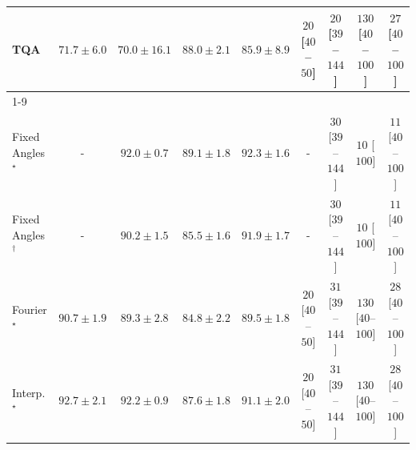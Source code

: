 \begin{tabular}{l|cccc|cccc|}
TQA & {\cellcolor[HTML]{FEA937}} \color[HTML]{000000} $71.7\pm 6.0$ & {\cellcolor[HTML]{FEB541}} \color[HTML]{000000} $70.0\pm 16.1$ & {\cellcolor[HTML]{B13F03}} \color[HTML]{F1F1F1} $88.0\pm 2.1$ & {\cellcolor[HTML]{C44802}} \color[HTML]{F1F1F1} $85.9\pm 8.9$ & {\cellcolor[HTML]{FFF4F0}} \color[HTML]{000000} $20$ [$40$--$50$] & {\cellcolor[HTML]{FFF4F0}} \color[HTML]{000000} $20$ [$39$--$144$] & {\cellcolor[HTML]{FDD9D6}} \color[HTML]{000000} $130$ [$40$--$100$] & {\cellcolor[HTML]{FFF3EF}} \color[HTML]{000000} $27$ [$40$--$100$] \\
\cline{1-9}
\multicolumn{9}{c}{\rule{0pt}{8pt}PP} \\
\midrule
Fixed Angles$^\star$ & {\cellcolor[HTML]{000000}} \color[HTML]{F1F1F1} {\cellcolor{white}} \color{black} - & {\cellcolor[HTML]{006034}} \color[HTML]{F1F1F1} $92.0\pm 0.7$ & {\cellcolor[HTML]{0A703A}} \color[HTML]{F1F1F1} $89.1\pm 1.8$ & {\cellcolor[HTML]{005E33}} \color[HTML]{F1F1F1} $92.3\pm 1.6$ & {\cellcolor[HTML]{000000}} \color[HTML]{F1F1F1} {\cellcolor{white}} \color{black} - & {\cellcolor[HTML]{FFF2EE}} \color[HTML]{000000} $30$ [$39$--$144$] & {\cellcolor[HTML]{FFF7F3}} \color[HTML]{000000} $10$ [$100$] & {\cellcolor[HTML]{FFF6F2}} \color[HTML]{000000} $11$ [$40$--$100$] \\
Fixed Angles$^\dagger$ & {\cellcolor[HTML]{000000}} \color[HTML]{F1F1F1} {\cellcolor{white}} \color{black} - & {\cellcolor[HTML]{036B38}} \color[HTML]{F1F1F1} $90.2\pm 1.5$ & {\cellcolor[HTML]{208242}} \color[HTML]{F1F1F1} $85.5\pm 1.6$ & {\cellcolor[HTML]{006034}} \color[HTML]{F1F1F1} $91.9\pm 1.7$ & {\cellcolor[HTML]{000000}} \color[HTML]{F1F1F1} {\cellcolor{white}} \color{black} - & {\cellcolor[HTML]{FFF2EE}} \color[HTML]{000000} $30$ [$39$--$144$] & {\cellcolor[HTML]{FFF7F3}} \color[HTML]{000000} $10$ [$100$] & {\cellcolor[HTML]{FFF6F2}} \color[HTML]{000000} $11$ [$40$--$100$] \\
Fourier$^\star$ & {\cellcolor[HTML]{006837}} \color[HTML]{F1F1F1} $90.7\pm 1.9$ & {\cellcolor[HTML]{096F3A}} \color[HTML]{F1F1F1} $89.3\pm 2.8$ & {\cellcolor[HTML]{248644}} \color[HTML]{F1F1F1} $84.8\pm 2.2$ & {\cellcolor[HTML]{086E3A}} \color[HTML]{F1F1F1} $89.5\pm 1.8$ & {\cellcolor[HTML]{FFF4F0}} \color[HTML]{000000} $20$ [$40$--$50$] & {\cellcolor[HTML]{FFF2EE}} \color[HTML]{000000} $31$ [$39$--$144$] & {\cellcolor[HTML]{FDD9D6}} \color[HTML]{000000} $130$ [$40$--$100$] & {\cellcolor[HTML]{FFF3EF}} \color[HTML]{000000} $28$ [$40$--$100$] \\
Interp.$^\star$ & {\cellcolor[HTML]{005C32}} \color[HTML]{F1F1F1} $92.7\pm 2.1$ & {\cellcolor[HTML]{005F34}} \color[HTML]{F1F1F1} $92.2\pm 0.9$ & {\cellcolor[HTML]{13773D}} \color[HTML]{F1F1F1} $87.6\pm 1.8$ & {\cellcolor[HTML]{006636}} \color[HTML]{F1F1F1} $91.1\pm 2.0$ & {\cellcolor[HTML]{FFF4F0}} \color[HTML]{000000} $20$ [$40$--$50$] & {\cellcolor[HTML]{FFF2EE}} \color[HTML]{000000} $31$ [$39$--$144$] & {\cellcolor[HTML]{FDD9D6}} \color[HTML]{000000} $130$ [$40$--$100$] & {\cellcolor[HTML]{FFF3EF}} \color[HTML]{000000} $28$ [$40$--$100$] \\

\end{tabular}
